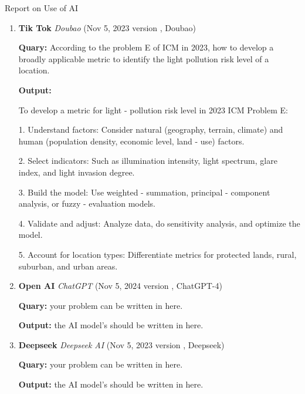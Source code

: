 \documentclass{mcmthesis}
\begin{document}
\begin{center}
    \LARGE{Report on Use of AI}
\end{center}
\begin{enumerate}
    \item \textbf{Tik Tok}  \textit{Doubao} (Nov 5, 2023 version , Doubao)
    \par \textbf{Quary:} According to the problem E of ICM in 2023, how to develop a broadly applicable metric to identify the light pollution risk level of a location.
    \par \textbf{Output:} 
    
To develop a metric for light - pollution risk level in 2023 ICM Problem E:
    
1. Understand factors: Consider natural (geography, terrain, climate) and human (population density, economic level, land - use) factors. \par
2. Select indicators: Such as illumination intensity, light spectrum, glare index, and light invasion degree.\par
3. Build the model: Use weighted - summation, principal - component analysis, or fuzzy - evaluation models.\par
4. Validate and adjust: Analyze data, do sensitivity analysis, and optimize the model.\par
5. Account for location types: Differentiate metrics for protected lands, rural, suburban, and urban areas.

    \vspace{0.3cm}
    \item \textbf{Open AI}  \textit{ChatGPT} (Nov 5, 2024 version , ChatGPT-4)
    \par \textbf{Quary:} your problem can be written in here.
    \par \textbf{Output:} the AI model's should be written in here.

     \vspace{0.3cm}
    \item \textbf{Deepseek}  \textit{Deepseek AI} (Nov 5, 2023 version , Deepseek)
    \par \textbf{Quary:} your problem can be written in here.
    \par \textbf{Output:} the AI model's should be written in here.
\end{enumerate}
\end{document}
